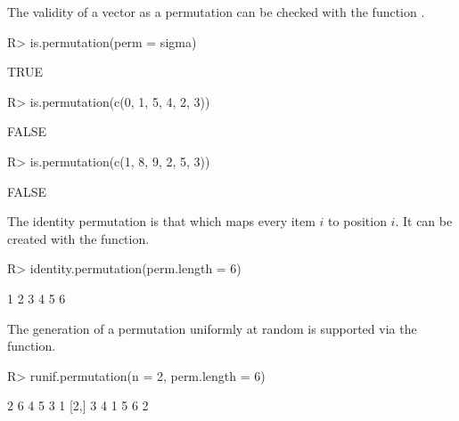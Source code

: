 \documentclass[article,nojss]{jss}
\begin{document}
The validity of a vector as a permutation can be checked with the function .
\begin{Schunk}
\begin{Sinput}
R> is.permutation(perm = sigma)
\end{Sinput}
\begin{Soutput}
[1] TRUE
\end{Soutput}
\begin{Sinput}
R> is.permutation(c(0, 1, 5, 4, 2, 3))
\end{Sinput}
\begin{Soutput}
[1] FALSE
\end{Soutput}
\begin{Sinput}
R> is.permutation(c(1, 8, 9, 2, 5, 3))
\end{Sinput}
\begin{Soutput}
[1] FALSE
\end{Soutput}
\end{Schunk}

The identity permutation is that which maps every item $i$ to position $i$. It can be created with the  function.
\begin{Schunk}
\begin{Sinput}
R> identity.permutation(perm.length = 6)
\end{Sinput}
\begin{Soutput}
[1] 1 2 3 4 5 6
\end{Soutput}
\end{Schunk}
The generation of a permutation uniformly at random is supported via the  function. 
\begin{Schunk}
\begin{Sinput}
R> runif.permutation(n = 2, perm.length = 6)
\end{Sinput}
\begin{Soutput}
     [,1] [,2] [,3] [,4] [,5] [,6]
[1,]    2    6    4    5    3    1
[2,]    3    4    1    5    6    2
\end{Soutput}
\end{Schunk}
\end{document}
